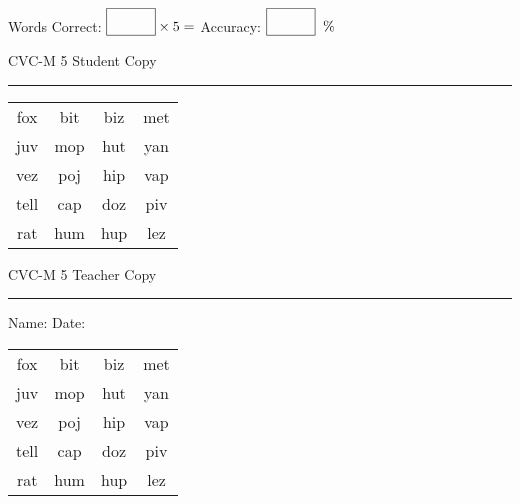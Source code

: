 \documentclass{memoir}
\begin{document}
\small

Words Correct: $\fbox{\phantom{\huge 100}} \times 5 = $ Accuracy: $\fbox{\phantom{\huge 100}}\;\; \%$ 

\vfill

\newpage


\footnotesize \noindent
CVC-M 5 \hfill Student Copy
\smallskip
\hrule

\Large

\setlength{\tabcolsep}{14pt}
\def\arraystretch{2}

{\selectfont


\begin{vplace}[0.5]
\begin{center}
\begin{tabular}{cccc}
fox & bit & biz & met \\
juv & mop & hut & yan \\
vez & poj & hip & vap \\
tell & cap & doz & piv \\
rat & hum & hup & lez \\
\end{tabular}
\end{center}
\end{vplace}

}

\newpage

\footnotesize \noindent
CVC-M 5 \hfill Teacher Copy
\smallskip
\hrule

\small

\vfill

\noindent
Name: \underline{\hspace{1.75in}} \hfill Date: \underline{\hspace{1in}}

\Large

{\selectfont


\begin{vplace}[0.5]
\begin{center}
\begin{tabular}{cccc}
fox & bit & biz & met \\
juv & mop & hut & yan \\
vez & poj & hip & vap \\
tell & cap & doz & piv \\
rat & hum & hup & lez \\
\end{tabular}
\end{center}
\end{vplace}



}
\end{document}
